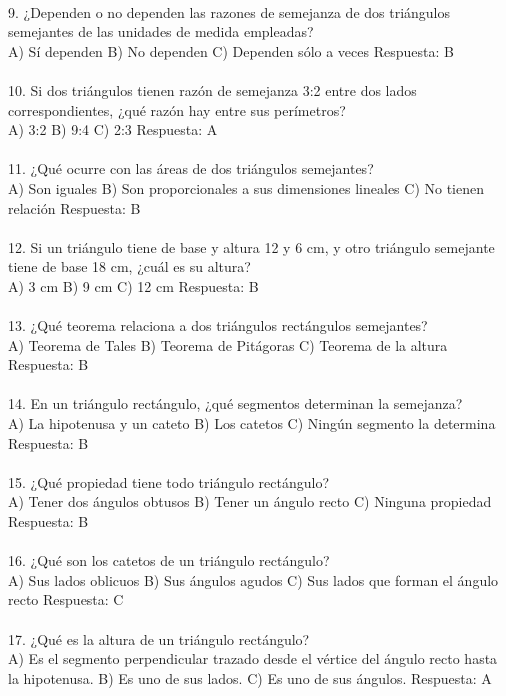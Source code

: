 \documentclass{article}
\begin{document}
\\
9. ¿Dependen o no dependen las razones de semejanza de dos triángulos semejantes de las unidades de medida empleadas? \\
A) Sí dependen    B) No dependen   C) Dependen sólo a veces    Respuesta: B\\
\\
10. Si dos triángulos tienen razón de semejanza 3:2 entre dos lados correspondientes, ¿qué razón hay entre sus perímetros? \\
A) 3:2   B) 9:4    C) 2:3   Respuesta: A\\
\\
11. ¿Qué ocurre con las áreas de dos triángulos semejantes? \\
A) Son iguales    B) Son proporcionales a sus dimensiones lineales   C) No tienen relación    Respuesta: B\\
\\
12. Si un triángulo tiene de base y altura 12 y 6 cm, y otro triángulo semejante tiene de base 18 cm, ¿cuál es su altura?\\
A) 3 cm   B) 9 cm    C) 12 cm   Respuesta: B \\
\\
13. ¿Qué teorema relaciona a dos triángulos rectángulos semejantes? \\
A) Teorema de Tales   B) Teorema de Pitágoras    C) Teorema de la altura    Respuesta: B\\
\\
14. En un triángulo rectángulo, ¿qué segmentos determinan la semejanza?  \\
A) La hipotenusa y un cateto   B) Los catetos   C) Ningún segmento la determina   Respuesta: B\\
\\
15. ¿Qué propiedad tiene todo triángulo rectángulo?  \\
A) Tener dos ángulos obtusos    B) Tener un ángulo recto   C) Ninguna propiedad     Respuesta: B  \\
\\
16. ¿Qué son los catetos de un triángulo rectángulo?\\
A) Sus lados oblicuos   B) Sus ángulos agudos  C) Sus lados que forman el ángulo recto   Respuesta: C  \\
\\
17. ¿Qué es la altura de un triángulo rectángulo? \\
A) Es el segmento perpendicular trazado desde el vértice del ángulo recto hasta la hipotenusa.   B) Es uno de sus lados.   C) Es uno de sus ángulos.    Respuesta: A\\
\end{document}
